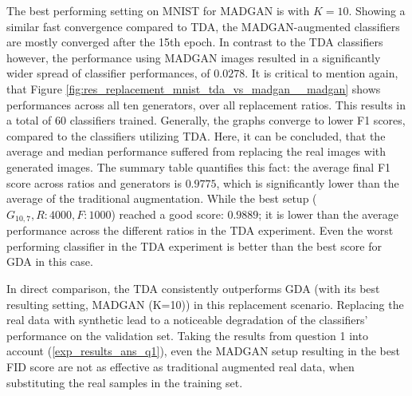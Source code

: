The best performing setting on MNIST for MADGAN is with $K=10$. Showing a similar fast convergence compared to TDA, the MADGAN-augmented classifiers are mostly converged after the 15th epoch. In contrast to the TDA classifiers however, the performance using MADGAN images resulted in a significantly wider spread of classifier performances, of $0.0278$. It is critical to mention again, that Figure \ref{fig:res_replacement_mnist_tda_vs_madgan__madgan} shows performances across all ten generators, over all replacement ratios. This results in a total of $60$ classifiers trained. Generally, the graphs converge to lower F1 scores, compared to the classifiers utilizing TDA. Here, it can be concluded, that the average and median performance suffered from replacing the real images with generated images. The summary table quantifies this fact: the average final F1 score across ratios and generators is $0.9775$, which is significantly lower than the average of the traditional augmentation. While the best setup (\(G_{10,7}, R:4000, F:1000\)) reached a good score: $0.9889$; it is lower than the average performance across the different ratios in the TDA experiment. Even the worst performing classifier in the TDA experiment is better than the best score for GDA in this case.

In direct comparison, the TDA consistently outperforms GDA (with its best resulting setting, MADGAN (K=10)) in this replacement scenario. Replacing the real data with synthetic lead to a noticeable degradation of the classifiers' performance on the validation set. Taking the results from question 1 into account (\ref{exp_results_ans_q1}), even the MADGAN setup resulting in the best FID score are not as effective as traditional augmented real data, when substituting the real samples in the training set.

